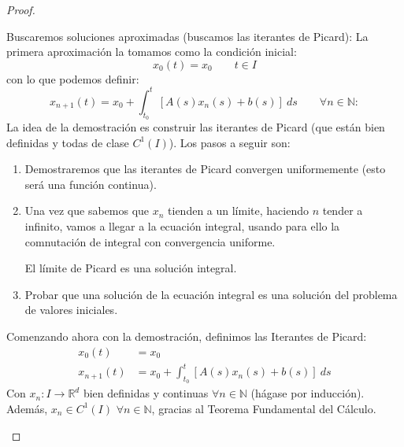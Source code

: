 \begin{teo}
\begin{proof}
\begin{itemize}
\begin{description}
                        Buscaremos soluciones aproximadas (buscamos las iterantes de Picard):
                        La primera aproximación la tomamos como la condición inicial:
                            \begin{equation*}
                                x_0(t) = x_0 \qquad t\in I
                            \end{equation*}
                            con lo que podemos definir:
                            \begin{equation*}
                                x_{n+1}(t) = x_0 + \int_{t_0}^{t} [A(s)x_n(s) + b(s)]~ds \qquad \forall n\in \mathbb{N}
 :                           \end{equation*}
                        La idea de la demostración es construir las iterantes de Picard (que están bien definidas y todas de clase $C^1(I)$). Los pasos a seguir son:
                        \begin{enumerate}
                            \item Demostraremos que las iterantes de Picard convergen uniformemente (esto será una función continua).
                            \item Una vez que sabemos que $x_n$ tienden a un límite, haciendo $n$ tender a infinito, vamos a llegar a la ecuación integral, usando para ello la comnutación de integral con convergencia uniforme.

                                El límite de Picard es una solución integral.
                            \item Probar que una solución de la ecuación integral es una solución del problema de valores iniciales.
                        \end{enumerate}

                        Comenzando ahora con la demostración, definimos las Iterantes de Picard:
                        \begin{align*}
                            x_0(t) &= x_0 \\
                            x_{n+1}(t) &= x_0 + \int_{t_0}^{t} [A(s)x_n(s)+b(s)]~ds 
                        \end{align*}
                        Con $x_n:I\rightarrow\mathbb{R}^d$ bien definidas y continuas $\forall n\in \mathbb{N}$ (hágase por inducción). Además, $x_n\in C^1(I)$ $\forall n\in \mathbb{N}$, gracias al Teorema Fundamental del Cálculo.\\


\end{description}
\end{itemize}
\end{proof}
\end{teo}
